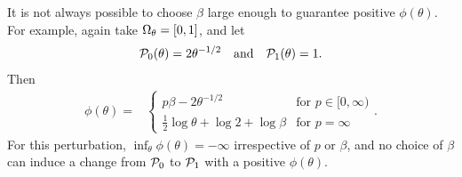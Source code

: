 \begin{ex}
%
It is not always possible to choose $\beta$ large enough to guarantee positive
$\phi(\theta)$. For example, again take $\Omega_{\theta}=[0,1]$, and let
%
\begin{align*}
%
\pbase(\theta) ={} 2 \theta^{-1/2} \mathand
\palt(\theta) ={} 1.
%
\end{align*}
%
Then
%
\begin{align*}
%
\phi(\theta) ={}&
\begin{cases}
        p\beta - 2 \theta^{-1/2} & \textrm{for }p \in [0, \infty) \\
        \frac{1}{2} \log \theta + \log 2 + \log \beta
            & \textrm{for }p = \infty
\end{cases}.
%
\end{align*}
%
For this perturbation, $\inf_\theta \phi(\theta) = -\infty$ irrespective
of $p$ or $\beta$, and no choice of $\beta$ can induce a change from
$\mathcal{P}_{0}$ to $\mathcal{P}_{1}$ with a positive $\phi(\theta)$.
%
\end{ex}


